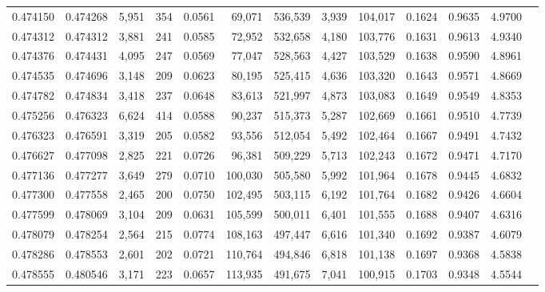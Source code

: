\begin{tabular}{rrrrrrrrrrrrr}
0.474150 & 0.474268 &  5,951 &   354 &                                     0.0561 &  69,071 & 536,539 &   3,939 & 104,017 & 0.1624 & 0.9635 & 4.9700 \\
0.474312 & 0.474312 &  3,881 &   241 &                                     0.0585 &  72,952 & 532,658 &   4,180 & 103,776 & 0.1631 & 0.9613 & 4.9340 \\
0.474376 & 0.474431 &  4,095 &   247 &                                     0.0569 &  77,047 & 528,563 &   4,427 & 103,529 & 0.1638 & 0.9590 & 4.8961 \\
0.474535 & 0.474696 &  3,148 &   209 &                                     0.0623 &  80,195 & 525,415 &   4,636 & 103,320 & 0.1643 & 0.9571 & 4.8669 \\
0.474782 & 0.474834 &  3,418 &   237 &                                     0.0648 &  83,613 & 521,997 &   4,873 & 103,083 & 0.1649 & 0.9549 & 4.8353 \\
0.475256 & 0.476323 &  6,624 &   414 &                                     0.0588 &  90,237 & 515,373 &   5,287 & 102,669 & 0.1661 & 0.9510 & 4.7739 \\
0.476323 & 0.476591 &  3,319 &   205 &                                     0.0582 &  93,556 & 512,054 &   5,492 & 102,464 & 0.1667 & 0.9491 & 4.7432 \\
0.476627 & 0.477098 &  2,825 &   221 &                                     0.0726 &  96,381 & 509,229 &   5,713 & 102,243 & 0.1672 & 0.9471 & 4.7170 \\
0.477136 & 0.477277 &  3,649 &   279 &                                     0.0710 & 100,030 & 505,580 &   5,992 & 101,964 & 0.1678 & 0.9445 & 4.6832 \\
0.477300 & 0.477558 &  2,465 &   200 &                                     0.0750 & 102,495 & 503,115 &   6,192 & 101,764 & 0.1682 & 0.9426 & 4.6604 \\
0.477599 & 0.478069 &  3,104 &   209 &                                     0.0631 & 105,599 & 500,011 &   6,401 & 101,555 & 0.1688 & 0.9407 & 4.6316 \\
0.478079 & 0.478254 &  2,564 &   215 &                                     0.0774 & 108,163 & 497,447 &   6,616 & 101,340 & 0.1692 & 0.9387 & 4.6079 \\
0.478286 & 0.478553 &  2,601 &   202 &                                     0.0721 & 110,764 & 494,846 &   6,818 & 101,138 & 0.1697 & 0.9368 & 4.5838 \\
0.478555 & 0.480546 &  3,171 &   223 &                                     0.0657 & 113,935 & 491,675 &   7,041 & 100,915 & 0.1703 & 0.9348 & 4.5544 \\

\end{tabular}

